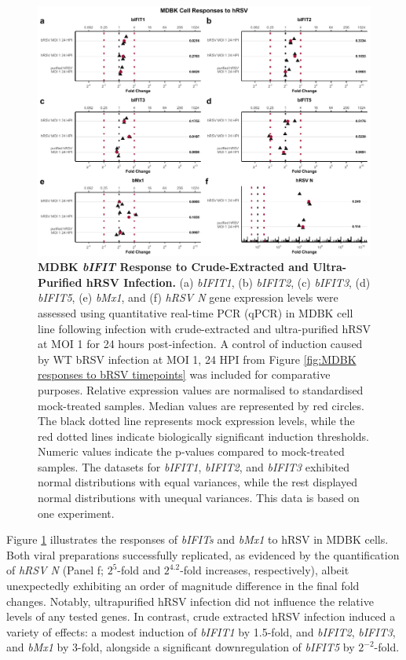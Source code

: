 \begin{figure}
    \centering
    \includegraphics[width=1\linewidth]{07. Chapter 2/Figs/02. Induction/07. mdbk_hrsv.pdf}
    \caption[MDBK \textit{bIFIT} Response to Crude-Extracted and Ultra-Purified hRSV Infection.]{\textbf{MDBK \textit{bIFIT} Response to Crude-Extracted and Ultra-Purified hRSV Infection.} (a) \textit{bIFIT1}, (b) \textit{bIFIT2}, (c) \textit{bIFIT3}, (d) \textit{bIFIT5}, (e) \textit{bMx1}, and (f) \textit{hRSV N} gene expression levels were assessed using quantitative real-time PCR (qPCR) in MDBK cell line following infection with crude-extracted and ultra-purified hRSV at MOI 1 for 24 hours post-infection. A control of induction caused by WT bRSV infection at MOI 1, 24 HPI from Figure \ref{fig:MDBK responses to bRSV timepoints} was included for comparative purposes. Relative expression values are normalised to standardised mock-treated samples. Median values are represented by red circles. The black dotted line represents mock expression levels, while the red dotted lines indicate biologically significant induction thresholds. Numeric values indicate the p-values compared to mock-treated samples. The datasets for \textit{bIFIT1}, \textit{bIFIT2}, and \textit{bIFIT3} exhibited normal distributions with equal variances, while the rest displayed normal distributions with unequal variances. This data is based on one experiment.}
    \label{fig:bIFIT responses to hRSV infection in MDBK}
\end{figure}

Figure \ref{fig:bIFIT responses to hRSV infection in MDBK} illustrates the responses of \textit{bIFITs} and \textit{bMx1} to hRSV in MDBK cells. Both viral preparations successfully replicated, as evidenced by the quantification of \textit{hRSV N} (Panel f; \(2^{5}\)-fold and \(2^{4.2}\)-fold increases, respectively), albeit unexpectedly exhibiting an order of magnitude difference in the final fold changes. Notably, ultrapurified hRSV infection did not influence the relative levels of any tested genes. In contrast, crude extracted hRSV infection induced a variety of effects: a modest induction of \textit{bIFIT1} by 1.5-fold, and \textit{bIFIT2}, \textit{bIFIT3}, and \textit{bMx1} by 3-fold, alongside a significant downregulation of \textit{bIFIT5} by \(2^{-2}\)-fold.

